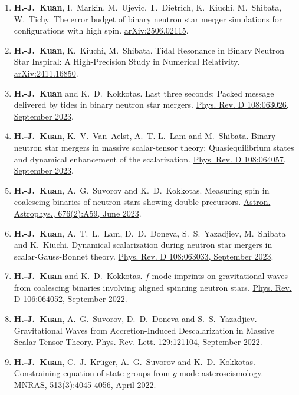 \documentclass[10pt,floatfix,a4paper]{article}
\begin{document}
\begin{enumerate}
	\item \textbf{H.-J.~Kuan}, I.~Markin, M.~Ujevic, T.~Dietrich, K.~Kiuchi, M.~Shibata, W.~Tichy. The error budget of binary neutron star merger simulations for configurations with high spin. \href{https://arxiv.org/abs/2506.02115}{arXiv:2506.02115}.
	\item \textbf{H.-J.~Kuan}, K.~Kiuchi, M.~Shibata. Tidal Resonance in Binary Neutron Star Inspiral: A High-Precision Study in Numerical Relativity. \href{https://arxiv.org/abs/2411.16850}{arXiv:2411.16850}.
	\item \textbf{H.-J.~Kuan} and K.~D.~Kokkotas. Last three seconds: Packed message delivered by tides in binary neutron star mergers. \href{https://journals.aps.org/prd/abstract/10.1103/PhysRevD.108.063026}{Phys. Rev. D 108:063026, September 2023}. 
	\item \textbf{H.-J.~Kuan}, K.~V.~Van~Aelst, A.~T.-L.~Lam and M.~Shibata. Binary neutron star mergers in massive scalar-tensor theory: Quasiequilibrium states and dynamical enhancement of the scalarization. \href{https://journals.aps.org/prd/abstract/10.1103/PhysRevD.108.064057}{Phys. Rev. D 108:064057, September 2023}.
	\item \textbf{H.-J.~Kuan}, A.~G.~Suvorov and K.~D.~Kokkotas. Measuring spin in coalescing binaries of neutron stars showing double precursors. \href{	https://doi.org/10.1051/0004-6361/202346658}{Astron. Astrophys., 676(2):A59, June 2023}.
	\item \textbf{H.-J.~Kuan}, A.~T.~L.~Lam, D.~D.~Doneva, S.~S.~Yazadjiev, M.~Shibata and K.~Kiuchi. Dynamical scalarization during neutron star mergers in scalar-Gauss-Bonnet theory. \href{https://journals.aps.org/prd/abstract/10.1103/PhysRevD.108.063033}{Phys. Rev. D 108:063033, September 2023}.
	\item \textbf{H.-J.~Kuan} and K.~D.~Kokkotas. $f$-mode imprints on gravitational waves from coalescing binaries involving aligned spinning neutron stars. \href{https://journals.aps.org/prd/abstract/10.1103/PhysRevD.106.064052}{Phys. Rev. D 106:064052, September 2022}.
	\item \textbf{H.-J.~Kuan}, A.~G.~Suvorov, D.~D.~Doneva and S.~S.~Yazadjiev. Gravitational Waves from Accretion-Induced Descalarization in Massive Scalar-Tensor Theory. \href{https://journals.aps.org/prl/abstract/10.1103/PhysRevLett.129.121104}{Phys. Rev. Lett. 129:121104, September 2022}.
	\item \textbf{H.-J.~Kuan}, C.~J.~Kr{\"u}ger, A.~G.~Suvorov and K.~D.~Kokkotas. Constraining equation of state groups from $g$-mode asteroseismology. \href{https://doi.org/10.1093/mnras/stac1101}{MNRAS, 513(3):4045-4056, April 2022}.

\end{enumerate}
\end{document}

